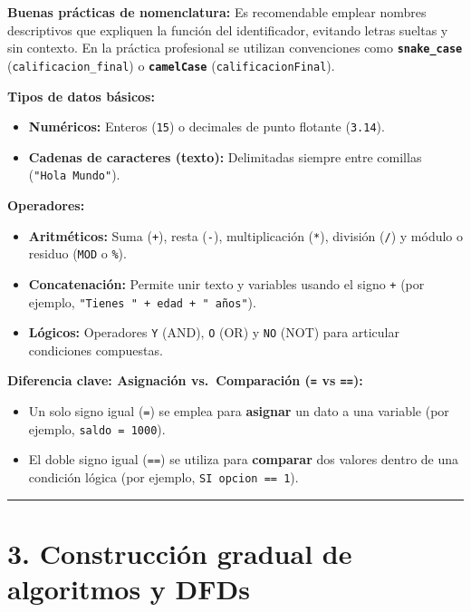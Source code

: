\textbf{Buenas prácticas de nomenclatura:} Es recomendable emplear
nombres descriptivos que expliquen la función del identificador,
evitando letras sueltas y sin contexto. En la práctica profesional se
utilizan convenciones como \textbf{\texttt{snake\_case}}
(\texttt{calificacion\_final}) o \textbf{\texttt{camelCase}}
(\texttt{calificacionFinal}).

\textbf{Tipos de datos básicos:}

\begin{itemize}
\tightlist
\item
  \textbf{Numéricos:} Enteros (\texttt{15}) o decimales de punto
  flotante (\texttt{3.14}).
\item
  \textbf{Cadenas de caracteres (texto):} Delimitadas siempre entre
  comillas (\texttt{"Hola\ Mundo"}).
\end{itemize}

\textbf{Operadores:}

\begin{itemize}
\tightlist
\item
  \textbf{Aritméticos:} Suma (\texttt{+}), resta (\texttt{-}),
  multiplicación (\texttt{*}), división (\texttt{/}) y módulo o residuo
  (\texttt{MOD} o \texttt{\%}).
\item
  \textbf{Concatenación:} Permite unir texto y variables usando el signo
  \texttt{+} (por ejemplo, \texttt{"Tienes\ "\ +\ edad\ +\ "\ años"}).
\item
  \textbf{Lógicos:} Operadores \texttt{Y} (AND), \texttt{O} (OR) y
  \texttt{NO} (NOT) para articular condiciones compuestas.
\end{itemize}

\textbf{Diferencia clave: Asignación vs.~Comparación (\texttt{=} vs
\texttt{==}):}

\begin{itemize}
\tightlist
\item
  Un solo signo igual (\texttt{=}) se emplea para \textbf{asignar} un
  dato a una variable (por ejemplo, \texttt{saldo\ =\ 1000}).
\item
  El doble signo igual (\texttt{==}) se utiliza para \textbf{comparar}
  dos valores dentro de una condición lógica (por ejemplo,
  \texttt{SI\ opcion\ ==\ 1}).
\end{itemize}

\begin{center}\rule{0.5\linewidth}{0.5pt}\end{center}

\section{3. Construcción gradual de algoritmos y
DFDs}\label{construcciuxf3n-gradual-de-algoritmos-y-dfds}

